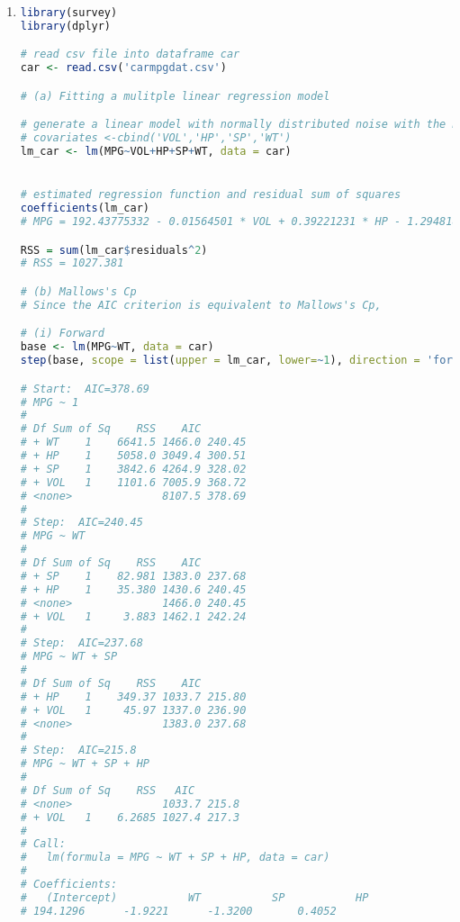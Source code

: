 \documentclass[a4paper,10pt]{article}
\theoremstyle{definition}
\begin{document}
\begin{enumerate}
\begin{enumerate}[(a)]
\begin{align*}
r(f,\theta) &= \sum_{\theta=1,2}R(\theta,\hat{\theta}_{p,q})\mathbb{P}(\theta)\\
&= \lambda R(1,\hat{\theta}_{p,q})+ (1-\lambda)R(2,\hat{\theta}_{p,q})
\end{align*}
where $R(1,\hat{\theta}_{p,q})$ and $R(2,\hat{\theta}_{p,q})$ are the values are from (a).
\item Given $\lambda = 1/2$, we have
\begin{align*}
r(f,\theta)=\frac{1}{2} \left(R(1,\hat{\theta}_{p,q})+ R(2,\hat{\theta}_{p,q})\right) &=\frac{1}{2}\left(16.3-13.6p_B-14.7q_B-24.8p_W-27.6q_W-5.6p_G-5.6q_G\right)
\end{align*}
thus to the infimum of Bayes risk is when $q_B = q_W = q_G =1$.
\end{enumerate}

\newpage
\item


\begin{lstlisting}[language=R,commentstyle=\fontseries{lc}\color{gray}]
library(survey)
library(dplyr)

# read csv file into dataframe car
car <- read.csv('carmpgdat.csv')

# (a) Fitting a mulitple linear regression model

# generate a linear model with normally distributed noise with the model MPG~VOL+HP+SP+WT
# covariates <-cbind('VOL','HP','SP','WT')
lm_car <- lm(MPG~VOL+HP+SP+WT, data = car)


# estimated regression function and residual sum of squares
coefficients(lm_car)
# MPG = 192.43775332 - 0.01564501 * VOL + 0.39221231 * HP - 1.29481848 * SP - 1.85980373 * WT

RSS = sum(lm_car$residuals^2)
# RSS = 1027.381

# (b) Mallows's Cp
# Since the AIC criterion is equivalent to Mallows's Cp, 

# (i) Forward
base <- lm(MPG~WT, data = car)
step(base, scope = list(upper = lm_car, lower=~1), direction = 'forward', trace = TRUE)

# Start:  AIC=378.69
# MPG ~ 1
# 
# Df Sum of Sq    RSS    AIC
# + WT    1    6641.5 1466.0 240.45
# + HP    1    5058.0 3049.4 300.51
# + SP    1    3842.6 4264.9 328.02
# + VOL   1    1101.6 7005.9 368.72
# <none>              8107.5 378.69
# 
# Step:  AIC=240.45
# MPG ~ WT
# 
# Df Sum of Sq    RSS    AIC
# + SP    1    82.981 1383.0 237.68
# + HP    1    35.380 1430.6 240.45
# <none>              1466.0 240.45
# + VOL   1     3.883 1462.1 242.24
# 
# Step:  AIC=237.68
# MPG ~ WT + SP
# 
# Df Sum of Sq    RSS    AIC
# + HP    1    349.37 1033.7 215.80
# + VOL   1     45.97 1337.0 236.90
# <none>              1383.0 237.68
# 
# Step:  AIC=215.8
# MPG ~ WT + SP + HP
# 
# Df Sum of Sq    RSS   AIC
# <none>              1033.7 215.8
# + VOL   1    6.2685 1027.4 217.3
# 
# Call:
#   lm(formula = MPG ~ WT + SP + HP, data = car)
# 
# Coefficients:
#   (Intercept)           WT           SP           HP  
# 194.1296      -1.9221      -1.3200       0.4052 


\end{lstlisting}
\end{enumerate}
\end{document}
